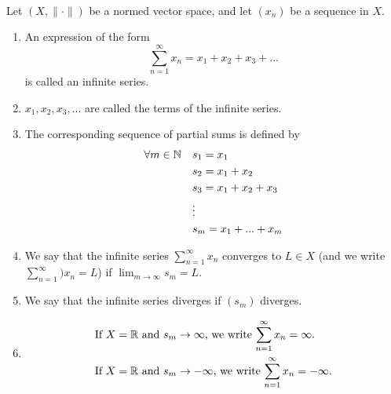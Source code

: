 \begin{definition}  \leavevmode \\
    Let $\left(X, \| \cdot \| \right)$ be a normed vector space, and let $(x_n)$ be a sequence in $X$.
    \begin{enumerate}[$(i)$]
        \item An expression of the form
        $$\sum_{n=1}^{\infty} x_n = x_1 + x_2 + x_3 + ...$$
        is called an infinite series.
        \item $x_1, x_2, x_3, ...$ are called the terms of the infinite series.
        \item The corresponding sequence of partial sums is defined by
        \begin{align*}
            \forall m \in \mathbb{N} ~~~
            &s_1 = x_1 \\
            &s_2 = x_1 + x_2 \\
            &s_3 = x_1 + x_2 + x_3 \\
            &\vdots \\
            &s_m = x_1 + ... + x_m
        \end{align*}
        \item We say that the infinite series $\sum_{n=1}^{\infty} x_n $ converges to $L\in X$ (and we write $\sum_{n=1}^{\infty})x_n = L$) if $\lim_{m \to \infty}s_m = L$.
        \item We say that the infinite series diverges if $(s_m)$ diverges.
        \item
        \begin{align*}
            &\text{If $X=\mathbb{R}$ and $s_m \to \infty$, we write $\sum_{n=1}^{\infty}x_n = \infty$.} \\
            &\text{If $X=\mathbb{R}$ and $s_m \to -\infty$, we write $\sum_{n=1}^{\infty}x_n = -\infty$.} 
        \end{align*}
    \end{enumerate}
\end{definition}

